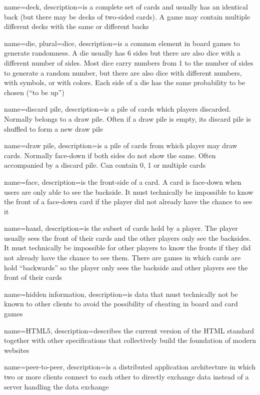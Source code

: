 
{
  name=deck,
  description={is a complete set of cards and usually has an identical
  back (but there may be decks of two-sided cards). A game may contain
  multiple different decks with the same or different backs}
}

{
  name=die,
  plural=dice,
  description={is a common element in board games to generate randomness. A die
  usually has 6 sides but there are also dice with a different number of sides.
  Most dice carry numbers from 1 to the number of sides to generate a random
  number, but there are also dice with different numbers, with symbols, or with
  colors. Each side of a die has the same probability to be chosen (“to be
  up”)}
}

{
  name=discard pile,
  description={is a pile of cards which players discarded. Normally belongs to
  a draw pile. Often if a draw pile is empty, its discard pile is shuffled to
  form a new draw pile}
}

{
  name=draw pile,
  description={is a pile of cards from which player may draw cards. Normally
  face-down if both sides do not show the same. Often accompanied by a
  discard pile. Can contain 0, 1 or multiple cards}
}

{
  name=face,
  description={is the front-side of a card. A card is face-down when users
  are only able to see the backside. It must technically be impossible to know
  the front of a face-down card if the player did not already have the chance
  to see it}
}

{
  name=hand,
  description={is the subset of cards hold by a player. The player usually sees
  the front of their cards and the other players only see the backsides. It must
  technically be impossible for other players to know the fronts if they did
  not already have the chance to see them. There are games in which cards are
  hold “backwards” so the player only sees the backside and other players see
  the front of their cards}
}

{
  name={hidden information},
  description={is data that must technically not be known to other clients to
  avoid the possibility of cheating in board and card games}
}

{
  name=HTML5,
  description={describes the current version of the HTML standard together with
  other specifications that collectively build the foundation of modern
  websites}
}

{
  name=peer-to-peer,
  description={is a distributed application architecture in which two or more
  clients connect to each other to directly exchange data instead of a server
  handling the data exchange}
}

